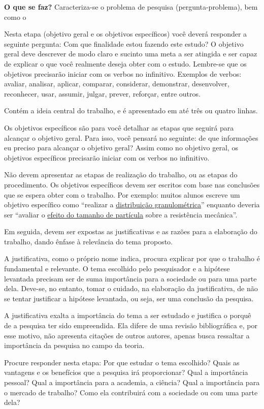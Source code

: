 \documentclass[
]{article}
\begin{document}
\textbf{O que se faz?} Caracteriza-se o problema de pesquisa
(pergunta-problema), bem como o

Nesta etapa (objetivo geral e os objetivos específicos) você deverá
responder a seguinte pergunta: Com que finalidade estou fazendo este
estudo? O objetivo geral deve descrever de modo claro e sucinto uma meta
a ser atingida e ser capaz de explicar o que você realmente deseja obter
com o estudo. Lembre-se que os objetivos precisarão iniciar com os
verbos no infinitivo. Exemplos de verbos: avaliar, analisar, aplicar,
comparar, considerar, demonstrar, desenvolver, reconhecer, usar,
assumir, julgar, prever, reforçar, entre outros.

Contém a ideia central do trabalho, e é apresentado em até três ou
quatro linhas.

Os objetivos específicos são para você detalhar as etapas que seguirá
para alcançar o objetivo geral. Para isso, você pensará no seguinte: de
que informações eu preciso para alcançar o objetivo geral? Assim como no
objetivo geral, os objetivos específicos precisarão iniciar com os
verbos no infinitivo.

Não devem apresentar as etapas de realização do trabalho, ou as etapas
do procedimento. Os objetivos específicos devem ser escritos com base
nas conclusões que se espera obter com o trabalho. Por exemplo: muitos
alunos escreve um objetivo específico como ``realizar a \ul{distribuição
granulométrica}'' enquanto deveria ser ``avaliar o \ul{efeito do tamanho
de partícula} sobre a resistência mecânica''.

Em seguida, devem ser expostas as justificativas e as razões para a
elaboração do trabalho, dando ênfase à relevância do tema proposto.

A justificativa, como o próprio nome indica, procura explicar por que o
trabalho é fundamental e relevante. O tema escolhido pelo pesquisador e
a hipótese levantada precisam ser de suma importância para a sociedade
ou para uma parte dela. Deve-se, no entanto, tomar o cuidado, na
elaboração da justificativa, de não se tentar justificar a hipótese
levantada, ou seja, ser uma conclusão da pesquisa.

A justificativa exalta a importância do tema a ser estudado e justifica
o porquê de a pesquisa ter sido empreendida. Ela difere de uma revisão
bibliográfica e, por esse motivo, não apresenta citações de outros
autores, apenas busca ressaltar a importância da pesquisa no campo da
teoria.

Procure responder nesta etapa: Por que estudar o tema escolhido? Quais
as vantagens e os benefícios que a pesquisa irá proporcionar? Qual a
importância pessoal? Qual a importância para a academia, a ciência? Qual
a importância para o mercado de trabalho? Como ela contribuirá com a
sociedade ou com uma parte dela?
\end{document}
